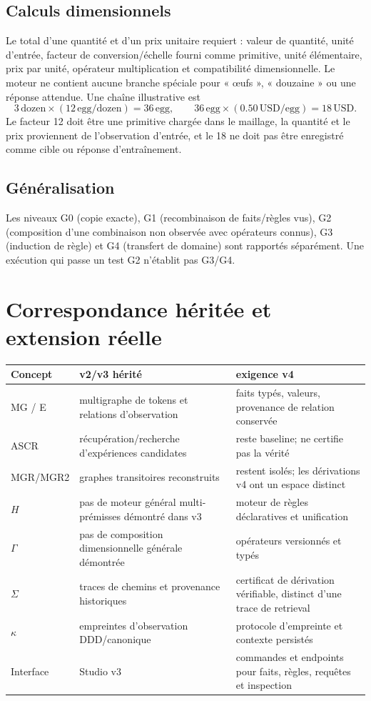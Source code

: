 \documentclass[11pt,a4paper]{book}
\begin{document}
\section{Calculs dimensionnels}
Le total d'une quantité et d'un prix unitaire requiert : valeur de quantité, unité d'entrée, facteur de conversion/échelle fourni comme primitive, unité élémentaire, prix par unité, opérateur multiplication et compatibilité dimensionnelle. Le moteur ne contient aucune branche spéciale pour « œufs », « douzaine » ou une réponse attendue. Une chaîne illustrative est
\[
3\,\mathrm{dozen}\times(12\,\mathrm{egg}/\mathrm{dozen})=36\,\mathrm{egg},\qquad
36\,\mathrm{egg}\times(0.50\,\mathrm{USD}/\mathrm{egg})=18\,\mathrm{USD}.
\]
Le facteur 12 doit être une primitive chargée dans le maillage, la quantité et le prix proviennent de l'observation d'entrée, et le 18 ne doit pas être enregistré comme cible ou réponse d'entraînement.

\section{Généralisation}
Les niveaux G0 (copie exacte), G1 (recombinaison de faits/règles vus), G2 (composition d'une combinaison non observée avec opérateurs connus), G3 (induction de règle) et G4 (transfert de domaine) sont rapportés séparément. Une exécution qui passe un test G2 n'établit pas G3/G4.

\chapter{Correspondance héritée et extension réelle}
\begin{longtable}{p{}p{}p{}}
\toprule
\textbf{Concept} & \textbf{v2/v3 hérité} & \textbf{exigence v4}\\
\midrule
MG / E & multigraphe de tokens et relations d'observation & faits typés, valeurs, provenance de relation conservée\\
ASCR & récupération/recherche d'expériences candidates & reste baseline; ne certifie pas la vérité\\
MGR/MGR2 & graphes transitoires reconstruits & restent isolés; les dérivations v4 ont un espace distinct\\
$H$ & pas de moteur général multi-prémisses démontré dans v3 & moteur de règles déclaratives et unification\\
$\Gamma$ & pas de composition dimensionnelle générale démontrée & opérateurs versionnés et typés\\
$\Sigma$ & traces de chemins et provenance historiques & certificat de dérivation vérifiable, distinct d'une trace de retrieval\\
$\kappa$ & empreintes d'observation DDD/canonique & protocole d'empreinte et contexte persistés\\
Interface & Studio v3 & commandes et endpoints pour faits, règles, requêtes et inspection\\
\bottomrule
\end{longtable}
\end{document}
